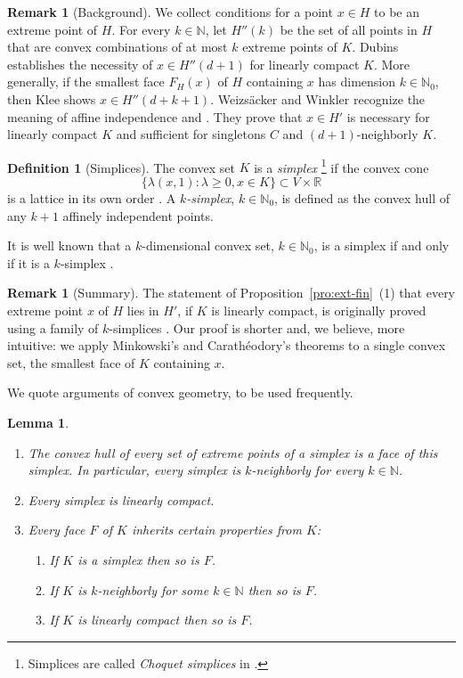 \documentclass[a4paper,11pt,reqno]{amsart}
\numberwithin{equation}{section}
\theoremstyle{plain}
\newtheorem{lemma}[theorem]{Lemma}
\theoremstyle{definition}
\newtheorem{definition}[theorem]{Definition}
\newtheorem{remark}[theorem]{Remark}
\newcommand{\N}{\mathbb{N}} %
\newcommand{\R}{\mathbb{R}} %
\begin{document}
%
\begin{remark}[Background]\label{rem:background-WWext}
We collect conditions for a point $x\in H$ to be an extreme point of $H$. 
For every $k\in\N$, let $H''(k)$ be the set of all points in $H$ that  
are convex combinations of at most $k$ extreme points of $K$. Dubins 
\cite{dubins62} establishes the necessity of $x\in H''(d+1)$ for linearly 
compact $K$. More generally, if the smallest face $F_H(x)$ of 
$H$ containing $x$ has dimension $k\in\N_0$, then Klee \cite{klee63-dubins} 
shows $x\in H''(d+k+1)$. Weizs\"{a}cker and Winkler recognize the meaning 
of affine independence \cite[lemma on p.~136]{weizsaecker-winkler80} and 
\cite[Proposition~2.1]{winkler88}. They prove that $x\in H'$ is necessary 
for linearly compact $K$ and sufficient for singletons $C$ and 
$(d+1)$-neighborly $K$. 
\end{remark}
%
\begin{definition}[Simplices]\label{def:simplex}
The convex set $K$ is a \emph{simplex}%
%
\footnote{Simplices are called \emph{Choquet simplices} in \cite{winkler85}.}
%
if the convex cone 
\[
\{\lambda(x,1): \lambda\geq 0, x\in K\}\subset V\times\R
\] 
is a lattice in its own order \cite[Section~10]{phelps01}. A \emph{$k$-simplex}, $k\in\N_0$,
is defined as the convex hull of any $k+1$ affinely independent points. 
\end{definition}
%
It is well known that a $k$-dimensional convex set, $k\in\N_0$, is a simplex if and only if
it is a $k$-simplex \cite[Proposition~10.10]{phelps01}.
\par
%
\begin{remark}[Summary]\label{rem:our-contribution-finite}
The statement of Proposition~\ref{pro:ext-fin}~(1) that every extreme point $x$ of $H$ lies 
in $H'$, if $K$ is linearly compact, is originally proved using a family of $k$-simplices 
\cite{weizsaecker-winkler80,winkler88}. Our proof is shorter and, we believe, more intuitive: 
we apply Minkowski's and Carath{\'e}odory's theorems to a single convex set, the smallest 
face of $K$ containing $x$. 
\end{remark}
%
We quote arguments of convex geometry, to be used frequently.
\par
%
\begin{lemma}\label{lem:basic-convexity}~
\begin{enumerate}
\item 
The convex hull of every set of extreme points of a simplex is a face of 
this simplex. In particular, every simplex is $k$-neighborly for every 
$k\in\N$. 
\item 
Every simplex is linearly compact.
\item
Every face $F$ of $K$ inherits certain properties from $K$:
\begin{enumerate}
\item 
If $K$ is a simplex then so is $F$.
\item 
If $K$ is $k$-neighborly for some $k\in\N$ then so is $F$.
\item 
If $K$ is linearly compact then so is $F$.
\end{enumerate}
\end{enumerate}
\end{lemma}
\end{document}
